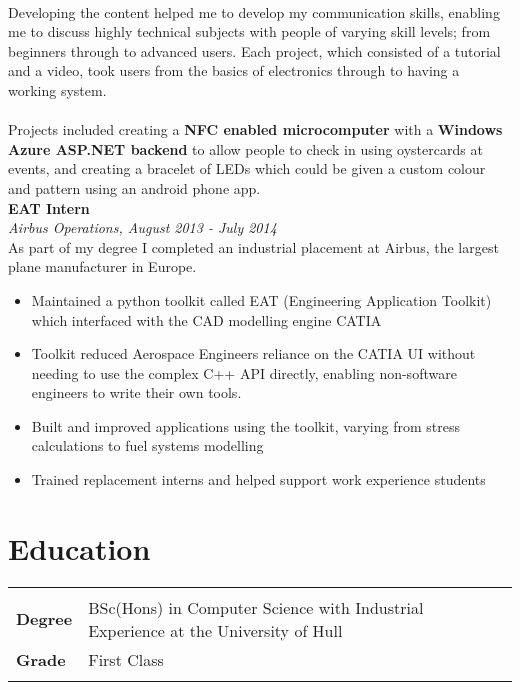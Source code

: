 \documentclass{article}
\begin{document}
\begin{flushleft}
\paragraph{}Developing the content helped me to develop my communication skills, enabling me to discuss highly technical subjects with people of varying skill levels; from beginners through to advanced users. Each project, which consisted of a tutorial and a video, took users from the basics of electronics through to having a working system.

\paragraph{}Projects included creating a \textbf{NFC enabled microcomputer} with a \textbf{Windows Azure ASP.NET backend} to allow people to check in using oystercards at events, and creating a bracelet of LEDs which could be given a custom colour and pattern using an android phone app. \\[10pt]

\textbf{EAT Intern}\\
\textit{Airbus Operations, August 2013 - July 2014}\\[5pt]
As part of my degree I completed an industrial placement at Airbus, the largest plane manufacturer in Europe. 

\begin{itemize}
\item Maintained a python toolkit called EAT (Engineering Application Toolkit) which interfaced with the CAD modelling engine CATIA
\item Toolkit reduced Aerospace Engineers reliance on the CATIA UI without needing to use the complex C++ API directly, enabling non-software engineers to write their own tools.
\item Built and improved applications using the toolkit, varying from stress calculations to fuel systems modelling	
\item Trained replacement interns and helped support work experience students
\end{itemize}

\section*{Education}
\begin{tabular}{@{}ll@{}}
    \multicolumn{2}{l}{}\\
    \textbf{Degree} &BSc(Hons) in Computer Science with Industrial Experience at the University of Hull  \\
    \textbf{Grade} &First Class   \\
    &\\
\end{tabular}


\end{flushleft}
\end{document}
